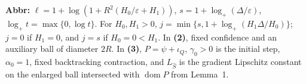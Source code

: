 \begin{table}[tp]
\begin{threeparttable}
\begin{tabularx}{\linewidth}{@{}>{\raggedright\arraybackslash}p{0.20\linewidth}>{\raggedright\arraybackslash}p{0.32\linewidth}>{\raggedright\arraybackslash}p{0.25\linewidth}>{\raggedright\arraybackslash}X@{}}
\bottomrule
\end{tabularx}
\begin{tablenotes}[flushleft]\footnotesize
\item[] \textbf{Abbr:} $\ell=1+\log(1+R^2(H_0/\varepsilon+H_1))$, $s=1+\log_+(\Delta/\varepsilon)$, $\log_+t=\max\{0,\log t\}$. For $H_0,H_1>0$, $j=\min\{s,1+\log_+(H_1\Delta/H_0)\}$; $j=0$ if $H_1=0$, and $j=s$ if $H_0=0<H_1$. In \textbf{(2)}, fixed confidence and an auxiliary ball of diameter $2R$. In \textbf{(3)}, $P=\psi+\iota_Q$, $\gamma_0>0$ is the initial step, $\alpha_0=1$, fixed backtracking contraction, and $L_{\widehat S}$ is the gradient Lipschitz constant on the enlarged ball intersected with $\operatorname{dom}P$ from Lemma~1.
\end{tablenotes}
\end{threeparttable}
\end{table}
\clearpage
